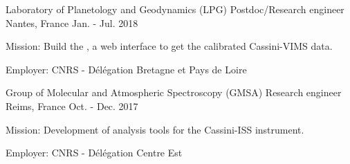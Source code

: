 
\begin{cventries}

  \cventry
    {Laboratory of Planetology and Geodynamics (LPG)}
    {Postdoc/Research engineer}
    {Nantes, France}
    {Jan. - Jul. 2018}
    {
      \begin{cvitems}
        \item{Mission: Build the
        ,
        a web interface to get the calibrated Cassini-VIMS data.}
        \item{Employer: CNRS - Délégation Bretagne et Pays de Loire}
      \end{cvitems}
      \vspace{1em}
    }

  \cventry
    {Group of Molecular and Atmospheric Spectroscopy (GMSA)}
    {Research engineer}
    {Reims, France}
    {Oct. - Dec. 2017}
    {
      \begin{cvitems}
        \item{Mission: Development of analysis tools for the Cassini-ISS instrument.}
        \item{Employer: CNRS - Délégation Centre Est}
      \end{cvitems}
      \vspace{1em}
    }

\end{cventries}
